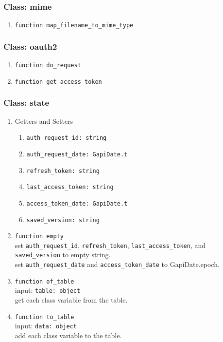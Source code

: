 \subsubsection{Class: mime}
\begin{enumerate}
    \item \verb|function map_filename_to_mime_type| 
\end{enumerate}
\subsubsection{Class: oauth2}
\begin{enumerate}
    \item \verb|function do_request| 
    \item \verb|function get_access_token| 
\end{enumerate}
\subsubsection{Class: state}
\begin{enumerate}
    \item Getters and Setters
    \begin{enumerate}
        \item \verb|auth_request_id: string|
        \item \verb|auth_request_date: GapiDate.t|
        \item \verb|refresh_token: string|
        \item \verb|last_access_token: string|
        \item \verb|access_token_date: GapiDate.t|
        \item \verb|saved_version: string|
    \end{enumerate}
    \item \verb|function empty| \\
    set \verb|auth_request_id|, \verb|refresh_token|, \verb|last_access_token|, and \verb|saved_version| to empty string. \\
    set \verb|auth_request_date| and \verb|access_token_date| to GapiDate.epoch.
    \item \verb|function of_table| \\
    input: \verb|table: object| \\
    get each class variable from the table. \\
    \item \verb|function to_table| \\
    input: \verb|data: object| \\
    add each class variable to the table. \\
\end{enumerate}
